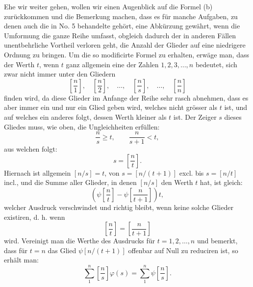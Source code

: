 \documentclass[11pt]{article}
\newcommand{\floor}[1]{\left[#1\right]}
\begin{document}
Ehe wir weiter gehen, wollen wir einen Augenblick auf die Formel (b) zurückkommen und die Bemerkung machen, dass es für manche Aufgaben, zu denen auch die in No. 5 behandelte gehört, eine Abkürzung gewährt, wenn die Umformung die ganze Reihe umfasst, obgleich dadurch der in anderen Fällen unentbehrliche Vortheil verloren geht, die Anzahl der Glieder auf eine niedrigere Ordnung zu bringen. Um die so modificirte Formel zu erhalten, erwäge man, dass der Werth $t$, wenn $t$ ganz allgemein eine der Zahlen $1,2,3,\ldots,n$ bedeutet, sich zwar nicht immer unter den Gliedern
\[
 \floor{\frac n1},\quad \floor{\frac n2},\quad \ldots,\quad
 \floor{\frac ns},\quad \ldots,\quad \floor{\frac nn}
\]
finden wird, da diese Glieder im Anfange der Reihe sehr rasch abnehmen, dass es aber immer ein und nur ein Glied geben wird, welches nicht grösser als $t$ ist, und auf welches ein anderes folgt, dessen Werth kleiner als $t$ ist. Der Zeiger $s$ dieses Gliedes muss, wie oben, die Ungleichheiten erfüllen:
\[
 \frac ns\geq t,
 \qquad \frac n{s+1}<t,
\]
aus welchen folgt:
\[
 s=\floor{\frac nt}.
\]
Hiernach ist allgemein $\floor{n/s}=t$, von $s=\floor{n/(t+1)}$ excl. bis $s=\floor{n/t}$ incl., und die Summe aller Glieder, in denen $\floor{n/s}$ den Werth $t$ hat, ist gleich:
\[
 \left(\psi\floor{\frac nt}-\psi\floor{\frac n{t+1}}\right)t,
\]
welcher Ausdruck verschwindet und richtig bleibt, wenn keine solche Glieder existiren, d. h. wenn
\[
 \floor{\frac nt}=\floor{\frac n{t+1}}
\]
wird. Vereinigt man die Werthe des Ausdrucks für $t=1,2,\ldots,n$ und bemerkt, dass für $t=n$ das Glied $\psi\floor{n/(t+1)}$ offenbar auf Null zu reduciren ist, so erhält man:
\begin{equation}
 \sum_{1}^{n}\floor{\frac ns}\varphi(s)=\sum_{1}^{n}\psi\floor{\frac ns}. \tag{c}
\end{equation}
\end{document}
